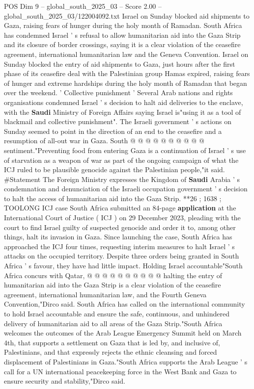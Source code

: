 \begin{textsample}{POS Dim 9 – global\_south\_2025\_03 – Score 2.00 – global\_south\_2025\_03/122004092.txt}  \label{ex:f9_pos_045}
Israel on Sunday blocked aid shipments to Gaza, raising fears of hunger during the holy month of Ramadan.
South Africa has condemned Israel ' s refusal to allow humanitarian aid into the Gaza Strip and its closure of border crossings, saying it is a clear violation of the ceasefire agreement, international humanitarian law and the Geneva Convention.
Israel on Sunday blocked the entry of aid shipments to Gaza, just hours after the first phase of its ceasefire deal with the Palestinian group Hamas expired, raising fears of hunger and extreme hardships during the holy month of Ramadan that began over the weekend. ' Collective punishment ' Several Arab nations and rights organisations condemned Israel ' s decision to halt aid deliveries to the enclave, with the \textbf{Saudi} Ministry of Foreign Affairs saying Israel is"using it as a tool of blackmail and collective punishment".
The Israeli government ' s actions on Sunday seemed to point in the direction of an end to the ceasefire and a resumption of all-out war in Gaza.
South @ @ @ @ @ @ @ @ @ @ sentiment."Preventing food from entering Gaza is a continuation of Israel ' s use of starvation as a weapon of war as part of the ongoing campaign of what the ICJ ruled to be plausible genocide against the Palestinian people,"it said. \#Statement The Foreign Ministry expresses the Kingdom of \textbf{Saudi} Arabia ' s condemnation and denunciation of the Israeli occupation government ' s decision to halt the access of humanitarian aid into the Gaza Strip. **26 ; 1638 ; TOOLONG ICJ case South Africa submitted an 84-page \textbf{application} at the International Court of Justice ( ICJ ) on 29 December 2023, pleading with the court to find Israel guilty of suspected genocide and order it to, among other things, halt its invasion in Gaza.
Since launching the case, South Africa has approached the ICJ four times, requesting interim measures to halt Israel ' s attacks on the occupied territory.
Despite three orders being granted in South Africa ' s favour, they have had little impact.
Holding Israel accountable"South Africa concurs with Qatar, @ @ @ @ @ @ @ @ @ @ halting the entry of humanitarian aid into the Gaza Strip is a clear violation of the ceasefire agreement, international humanitarian law, and the Fourth Geneva Convention,"Dirco said.
South Africa has called on the international community to hold Israel accountable and ensure the safe, continuous, and unhindered delivery of humanitarian aid to all areas of the Gaza Strip."South Africa welcomes the outcomes of the Arab League Emergency Summit held on March 4th, that supports a settlement on Gaza that is led by, and inclusive of, Palestinians, and that expressly rejects the ethnic cleansing and forced displacement of Palestinians in Gaza."South Africa supports the Arab League ' s call for a UN international peacekeeping force in the West Bank and Gaza to ensure security and stability,"Dirco said.

\end{textsample}
